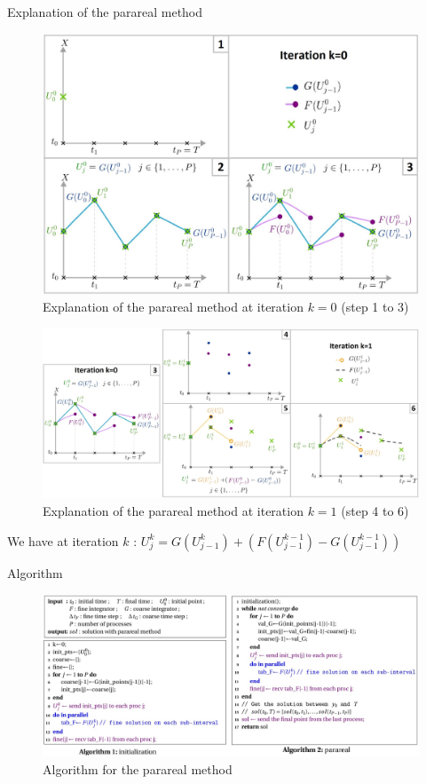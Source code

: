 \begin{frame}[allowframebreaks]{Explanation of the parareal method}
	\begin{figure}
		\centering
		\includegraphics[width=0.6\linewidth]{images/parareal/parareal_k0.jpg}
		\caption{Explanation of the parareal method at iteration $k=0$ (step 1 to 3)}
	\end{figure}
	\begin{figure}
		\centering
		\includegraphics[width=0.9\linewidth]{images/parareal/parareal_k1.jpg}
		\caption{Explanation of the parareal method at iteration $k=1$ (step 4 to 6)}
	\end{figure}
	\small
	We have at iteration $k$ : \qquad	$U_j^k=G(U_{j-1}^k)+(F(U_{j-1}^{k-1})-G(U_{j-1}^{k-1}))$
\end{frame}

\begin{frame}[allowframebreaks]{Algorithm}
	 \begin{figure}
	 	\centering
	 	\includegraphics[width=\linewidth]{images/parareal/algorithm.jpg}
	 	\caption{Algorithm for the parareal method}
	 \end{figure}
\end{frame}

